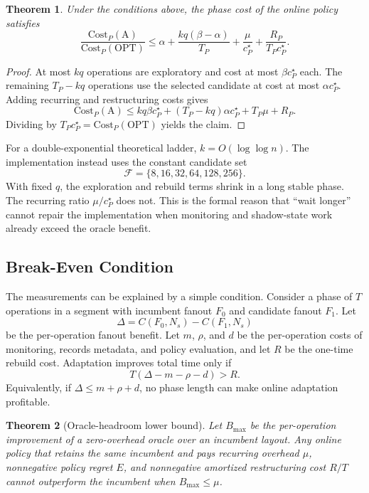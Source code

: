 \documentclass[sigconf,review,anonymous]{acmart}
\newtheorem{theorem}{Theorem}
\begin{document}
\begin{theorem}
Under the conditions above, the phase cost of the online policy satisfies
\[
 \frac{\mathrm{Cost}_P(\mathrm A)}
      {\mathrm{Cost}_P(\mathrm{OPT})}
 \le
 \alpha
 + \frac{kq(\beta-\alpha)}{T_P}
 + \frac{\mu}{c_P^\star}
 + \frac{R_P}{T_Pc_P^\star}.
\]
\end{theorem}

\begin{proof}
At most \(kq\) operations are exploratory and cost at most
\(\beta c_P^\star\) each.  The remaining \(T_P-kq\) operations use the
selected candidate at cost at most \(\alpha c_P^\star\).  Adding recurring
and restructuring costs gives
\[
 \mathrm{Cost}_P(\mathrm A)
 \le kq\beta c_P^\star
 +(T_P-kq)\alpha c_P^\star+T_P\mu+R_P.
\]
Dividing by \(T_Pc_P^\star=\mathrm{Cost}_P(\mathrm{OPT})\) yields the
claim.
\end{proof}

For a double-exponential theoretical ladder, \(k=O(\log\log n)\).  The
implementation instead uses the constant candidate set
\[
  \mathcal F=\{8,16,32,64,128,256\}.
\]
With fixed \(q\), the exploration and rebuild
terms shrink in a long stable phase.  The recurring ratio
\(\mu/c_P^\star\) does not.  This is the formal reason that ``wait longer''
cannot repair the implementation when monitoring and shadow-state work already
exceed the oracle benefit.

\subsection{Break-Even Condition}

The measurements can be explained by a simple condition.  Consider a phase of
\(T\) operations in a segment with incumbent fanout \(F_0\) and candidate
fanout \(F_1\).  Let
\[
  \Delta = C(F_0,N_s)-C(F_1,N_s)
\]
be the per-operation fanout benefit.  Let \(m\), \(\rho\), and \(d\) be the
per-operation costs of monitoring, records metadata, and policy evaluation,
and let \(R\) be the one-time rebuild cost.  Adaptation improves total time
only if
\[
  T(\Delta - m - \rho - d) > R.
\]
Equivalently, if \(\Delta \le m+\rho+d\), no phase length can make online
adaptation profitable.

\begin{theorem}[Oracle-headroom lower bound]
Let \(B_{\max}\) be the per-operation improvement of a zero-overhead oracle
over an incumbent layout.  Any online policy that retains the same incumbent
and pays recurring overhead \(\mu\), nonnegative policy regret \(E\), and
nonnegative amortized restructuring cost \(R/T\) cannot outperform the
incumbent when \(B_{\max}\le\mu\).
\end{theorem}
\end{document}
